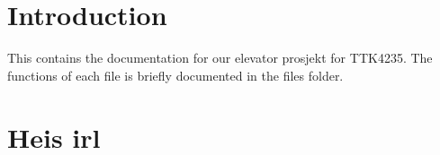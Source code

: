 \hypertarget{index_intro_sec}{}\section{Introduction}\label{index_intro_sec}
This contains the documentation for our elevator prosjekt for T\+T\+K4235. The functions of each file is briefly documented in the files folder.\hypertarget{index_heis_irl}{}\section{Heis irl}\label{index_heis_irl}
 